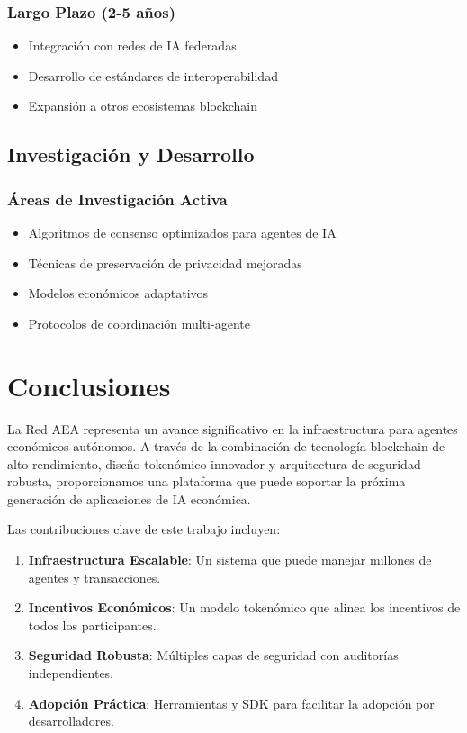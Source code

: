 \documentclass[12pt,a4paper]{article}
\begin{document}
\subsubsection{Largo Plazo (2-5 años)}
\begin{itemize}
\item Integración con redes de IA federadas
\item Desarrollo de estándares de interoperabilidad
\item Expansión a otros ecosistemas blockchain
\end{itemize}

\subsection{Investigación y Desarrollo}

\subsubsection{Áreas de Investigación Activa}
\begin{itemize}
\item Algoritmos de consenso optimizados para agentes de IA
\item Técnicas de preservación de privacidad mejoradas
\item Modelos económicos adaptativos
\item Protocolos de coordinación multi-agente
\end{itemize}

\section{Conclusiones}

La Red AEA representa un avance significativo en la infraestructura para agentes económicos autónomos. A través de la combinación de tecnología blockchain de alto rendimiento, diseño tokenómico innovador y arquitectura de seguridad robusta, proporcionamos una plataforma que puede soportar la próxima generación de aplicaciones de IA económica.

Las contribuciones clave de este trabajo incluyen:

\begin{enumerate}
\item \textbf{Infraestructura Escalable}: Un sistema que puede manejar millones de agentes y transacciones.
\item \textbf{Incentivos Económicos}: Un modelo tokenómico que alinea los incentivos de todos los participantes.
\item \textbf{Seguridad Robusta}: Múltiples capas de seguridad con auditorías independientes.
\item \textbf{Adopción Práctica}: Herramientas y SDK para facilitar la adopción por desarrolladores.
\end{enumerate}
\end{document}
